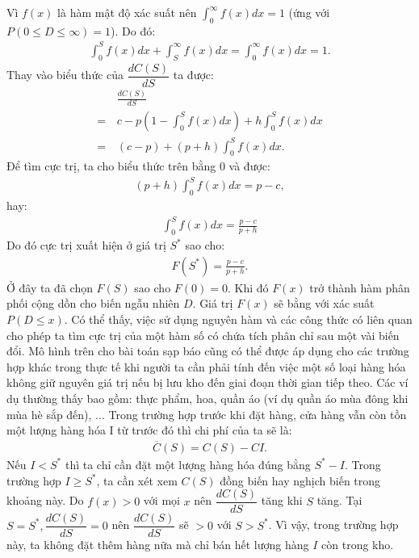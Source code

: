 \begin{multicols}{2}
	\vskip 0.1cm
	Vì $f(x)$ là hàm mật độ xác suất nên $\int_0^{\infty}{f(x)dx} = 1$ (ứng với $P(0 \le D \le \infty)=1$). Do đó:
	\begin{align*}
		\int_0^{S}{f(x)dx} + \int_S^{\infty}{f(x)dx} = \int_0^{\infty}{f(x)dx}=1.
	\end{align*}
	Thay vào biểu thức của $\dfrac{dC(S)}{dS}$ ta được:
	\begin{align*}
		&\frac{dC(S)}{dS} \\
		= \,&c- p\left(1- \int_0^{S}{f(x)dx}\right) + h\int_0^{S}{f(x)dx} \\
		= \,&(c-p) + (p+h)\int_0^{S}{f(x)dx}.
	\end{align*}
	Để tìm cực trị, ta cho biểu thức trên bằng $0$ và được:
	\begin{align*}
		(p+h)\int_0^{S}{f(x)dx} = p-c,
	\end{align*}
	hay:
	\begin{align*}
		\int_0^{S}{f(x)dx} = \frac{p-c}{p+h}
	\end{align*}
	Do đó cực trị xuất hiện ở giá trị $S^*$ sao cho:
	\begin{align*}
		F(S^*) = \frac{p-c}{p+h}.
	\end{align*}
	Ở đây ta đã chọn $F(S)$ sao cho $F(0)=0$. Khi đó $F(x)$ trở thành hàm phân phối cộng dồn cho biến ngẫu nhiên $D$. Giá trị $F(x)$ sẽ bằng với xác suất $P(D \le x)$.
	\vskip 0.1cm
	Có thể thấy, việc sử dụng nguyên hàm và các công thức có liên quan cho phép ta tìm cực trị của một hàm số có chứa tích phân chỉ sau một vài biến đổi.
	\vskip 0.1cm
	Mô hình trên cho bài toán sạp báo cũng có thể được áp dụng cho các trường hợp khác trong thực tế khi người ta cần phải tính đến việc một số loại hàng hóa không giữ nguyên giá trị nếu bị lưu kho đến giai đoạn thời gian tiếp theo. Các ví dụ thường thấy bao gồm: thực phẩm, hoa, quần áo (ví dụ quần áo mùa đông khi mùa hè sắp đến), ...
	\vskip 0.1cm
	Trong trường hợp trước khi đặt hàng, cửa hàng vẫn còn tồn một lượng hàng hóa I từ trước đó thì chi phí của ta sẽ là:
	\begin{align*}
		\overline{C}(S) = C(S) - CI.
	\end{align*}
	Nếu $I<S^*$ thì ta chỉ cần đặt một lượng hàng hóa đúng bằng $S^*-I$.
	\vskip 0.1cm
	Trong trường hợp $I\ge S^*$, ta cần xét xem $C(S)$ đồng biến hay nghịch biến trong khoảng này. Do $f(x)>0$ với mọi $x$ nên $\dfrac{dC(S)}{dS}$ tăng khi $S$ tăng. Tại $S=S^*, \dfrac{dC(S)}{dS}=0$ nên $\dfrac{dC(S)}{dS}$ sẽ $>0$ với $S>S^*$. Vì vậy, trong trường hợp này, ta không đặt thêm hàng nữa mà chỉ bán hết lượng hàng $I$ còn trong kho.

\end{multicols}
